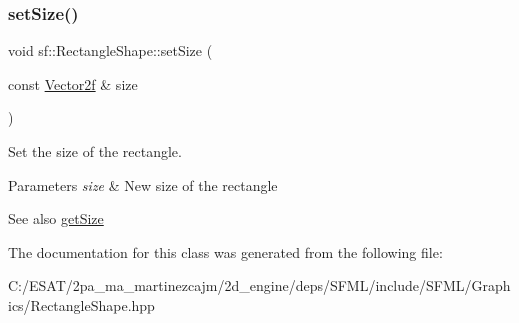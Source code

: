 \subsubsection{\texorpdfstring{set\+Size()}{setSize()}}
{\footnotesize\ttfamily void sf\+::\+Rectangle\+Shape\+::set\+Size (\begin{DoxyParamCaption}\item[{const \hyperlink{classsf_1_1_vector2}{Vector2f} \&}]{size }\end{DoxyParamCaption})}



Set the size of the rectangle. 


\begin{DoxyParams}{Parameters}
{\em size} & New size of the rectangle\\
\hline
\end{DoxyParams}
\begin{DoxySeeAlso}{See also}
\hyperlink{classsf_1_1_rectangle_shape_ae54a07ff5537bf76de6748f592b34896}{get\+Size} 
\end{DoxySeeAlso}


The documentation for this class was generated from the following file\+:\begin{DoxyCompactItemize}
\item 
C\+:/\+E\+S\+A\+T/2pa\+\_\+ma\+\_\+martinezcajm/2d\+\_\+engine/deps/\+S\+F\+M\+L/include/\+S\+F\+M\+L/\+Graphics/Rectangle\+Shape.\+hpp\end{DoxyCompactItemize}
